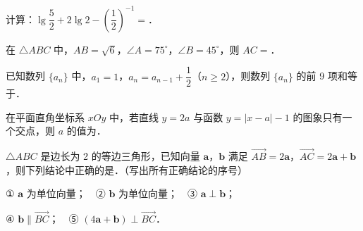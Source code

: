 \begin{question}
计算：\(\lg\dfrac{5}{2}+2\lg 2-\left(\dfrac{1}{2}\right)^{-1}=\)\gkblank{}．

\end{question}
\begin{question}
在 \(\triangle ABC\) 中，\(AB=\sqrt{6}\)，\(\angle A=75^{\circ}\)，\(\angle B=45^{\circ}\)，则 \(AC=\)\gkblank{}．

\end{question}
\begin{question}
已知数列 \(\{a_n\}\) 中，\(a_1=1\)，\(a_n=a_{n-1}+\dfrac{1}{2}\)（\(n\geqslant 2\)），则数列 \(\{a_n\}\) 的前 9 项和等于\gkblank{}．

\end{question}
\begin{question}
在平面直角坐标系 \(xOy\) 中，若直线 \(y=2a\) 与函数 \(y=|x-a|-1\) 的图象只有一个交点，则 \(a\) 的值为\gkblank{}．

\end{question}
\begin{question}
\(\triangle ABC\) 是边长为 2 的等边三角形，已知向量 \(\boldsymbol{a}\)，\(\boldsymbol{b}\) 满足 \(\overrightarrow{AB}=2\boldsymbol{a}\)，\(\overrightarrow{AC}=2\boldsymbol{a}+\boldsymbol{b}\)，则下列结论中正确的是\gkblank{}．（写出所有正确结论的序号）

① \(\boldsymbol{a}\) 为单位向量；　② \(\boldsymbol{b}\) 为单位向量；　③ \(\boldsymbol{a}\perp\boldsymbol{b}\)；

④ \(\boldsymbol{b}\parallel\overrightarrow{BC}\)；　⑤ \((4\boldsymbol{a}+\boldsymbol{b})\perp\overrightarrow{BC}\)．

\end{question}

